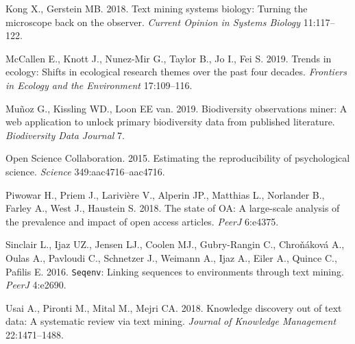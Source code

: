 \documentclass[author-year, review, 11pt]{components/elsarticle} %
\begin{document}
\leavevmode\hypertarget{ref-Kong2018}{}%
Kong X., Gerstein MB. 2018. Text mining systems biology: Turning the
microscope back on the observer. \emph{Current Opinion in Systems
Biology} 11:117--122.

\leavevmode\hypertarget{ref-McCallen2019}{}%
McCallen E., Knott J., Nunez-Mir G., Taylor B., Jo I., Fei S. 2019.
Trends in ecology: Shifts in ecological research themes over the past
four decades. \emph{Frontiers in Ecology and the Environment}
17:109--116.

\leavevmode\hypertarget{ref-Munoz2019}{}%
Muñoz G., Kissling WD., Loon EE van. 2019. Biodiversity observations
miner: A web application to unlock primary biodiversity data from
published literature. \emph{Biodiversity Data Journal} 7.

\leavevmode\hypertarget{ref-OSC2015}{}%
Open Science Collaboration. 2015. Estimating the reproducibility of
psychological science. \emph{Science} 349:aac4716--aac4716.

\leavevmode\hypertarget{ref-Piwowar2018}{}%
Piwowar H., Priem J., Larivière V., Alperin JP., Matthias L., Norlander
B., Farley A., West J., Haustein S. 2018. The state of OA: A large-scale
analysis of the prevalence and impact of open access articles.
\emph{PeerJ} 6:e4375.

\leavevmode\hypertarget{ref-Sinclair2016}{}%
Sinclair L., Ijaz UZ., Jensen LJ., Coolen MJ., Gubry-Rangin C.,
Chroňáková A., Oulas A., Pavloudi C., Schnetzer J., Weimann A., Ijaz A.,
Eiler A., Quince C., Pafilis E. 2016. \texttt{Seqenv}: Linking sequences
to environments through text mining. \emph{PeerJ} 4:e2690.

\leavevmode\hypertarget{ref-Usai2018}{}%
Usai A., Pironti M., Mital M., Mejri CA. 2018. Knowledge discovery out
of text data: A systematic review via text mining. \emph{Journal of
Knowledge Management} 22:1471--1488.
\end{document}
